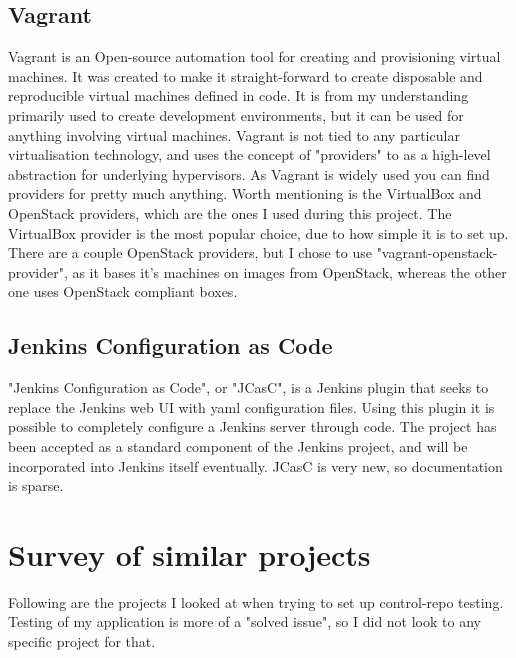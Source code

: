 \subsection{Vagrant}

Vagrant\cite{vagrantwebsite} is an Open-source automation tool for creating and provisioning virtual machines. It was created to make it straight-forward to create disposable and reproducible virtual machines defined in code. It is from my understanding primarily used to create development environments, but it can be used for anything involving virtual machines. Vagrant is not tied to any particular virtualisation technology, and uses the concept of "providers" to as a high-level abstraction for underlying hypervisors. As Vagrant is widely used you can find providers for pretty much anything. Worth mentioning is the VirtualBox and OpenStack providers, which are the ones I used during this project. The VirtualBox provider is the most popular choice, due to how simple it is to set up. There are a couple OpenStack providers, but I chose to use "vagrant-openstack-provider"\cite{vagrantopenstackprovidergithub}, as it bases it's machines on images from OpenStack, whereas the other one uses OpenStack compliant boxes.

\subsection{Jenkins Configuration as Code}

"Jenkins Configuration as Code"\cite{jcascwebsite}, or "JCasC", is a Jenkins plugin that seeks to replace the Jenkins web UI with yaml configuration files. Using this plugin it is possible to completely configure a Jenkins server through code. The project has been accepted as a standard component of the Jenkins project, and will be incorporated into Jenkins itself eventually. JCasC is very new, so documentation is sparse.


\section{Survey of similar projects}

Following are the projects I looked at when trying to set up control-repo testing. Testing of my application is more of a "solved issue", so I did not look to any specific project for that.

